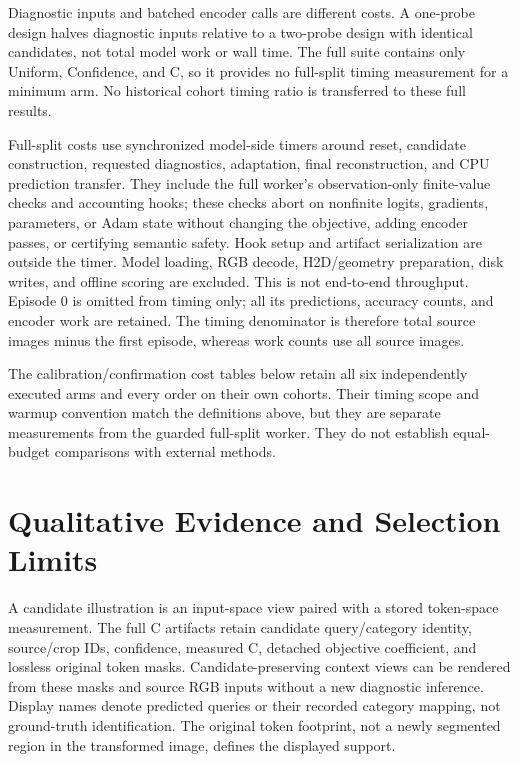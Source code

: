 Diagnostic inputs and batched encoder calls are different costs. A one-probe design halves diagnostic inputs relative to a two-probe design with identical candidates, not total model work or wall time. The full suite contains only Uniform, Confidence, and C, so it provides no full-split timing measurement for a minimum arm. No historical cohort timing ratio is transferred to these full results.

Full-split costs use synchronized model-side timers around reset, candidate construction, requested diagnostics, adaptation, final reconstruction, and CPU prediction transfer. They include the full worker's observation-only finite-value checks and accounting hooks; these checks abort on nonfinite logits, gradients, parameters, or Adam state without changing the objective, adding encoder passes, or certifying semantic safety. Hook setup and artifact serialization are outside the timer. Model loading, RGB decode, H2D/geometry preparation, disk writes, and offline scoring are excluded. This is not end-to-end throughput. Episode 0 is omitted from timing only; all its predictions, accuracy counts, and encoder work are retained. The timing denominator is therefore total source images minus the first episode, whereas work counts use all source images.



The calibration/confirmation cost tables below retain all six independently executed arms and every order on their own cohorts. Their timing scope and warmup convention match the definitions above, but they are separate measurements from the guarded full-split worker. They do not establish equal-budget comparisons with external methods.



\section{Qualitative Evidence and Selection Limits}
\label{app:figures}
A candidate illustration is an input-space view paired with a stored token-space measurement. The full C artifacts retain candidate query/category identity, source/crop IDs, confidence, measured C, detached objective coefficient, and lossless original token masks. Candidate-preserving context views can be rendered from these masks and source RGB inputs without a new diagnostic inference. Display names denote predicted queries or their recorded category mapping, not ground-truth identification. The original token footprint, not a newly segmented region in the transformed image, defines the displayed support.


